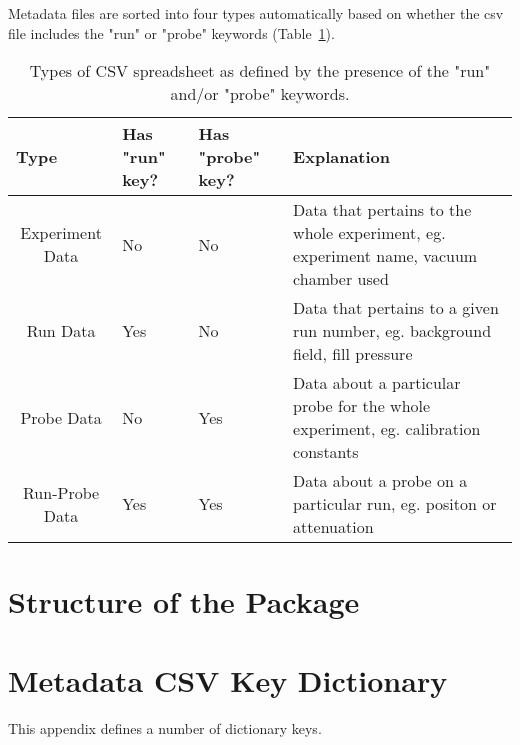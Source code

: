 \documentclass[12pt]{article}
\begin{document}
Metadata files are sorted into four types automatically based on whether the csv file includes the "run" or "probe" keywords (Table~\ref{csv_types}). 

\begin{table}[]
\begin{tabular}{p{1cm}p{2cm}p{2cm}p{6cm}}
Type                                 & Has "run" key? & Has "probe" key? & Explanation                                                                          \\ \hline
\multicolumn{1}{c|}{Experiment Data} & No             & No               & Data that pertains to the whole experiment, eg. experiment name, vacuum chamber used \\
\multicolumn{1}{c|}{Run Data}        & Yes            & No               & Data that pertains to a given run number, eg. background field, fill pressure        \\
\multicolumn{1}{c|}{Probe Data}      & No             & Yes              & Data about a particular probe for the whole experiment, eg. calibration constants    \\
\multicolumn{1}{c|}{Run-Probe Data}  & Yes            & Yes              & Data about a probe on a particular run, eg. positon or attenuation                  
\end{tabular}
\caption{Types of CSV spreadsheet as defined by the presence of the "run" and/or "probe" keywords.\label{csv_types}}
\end{table}




\section{Structure of the Package}


\appendix 

\section{Metadata CSV Key Dictionary}
This appendix defines a number of dictionary keys.

\end{document}
